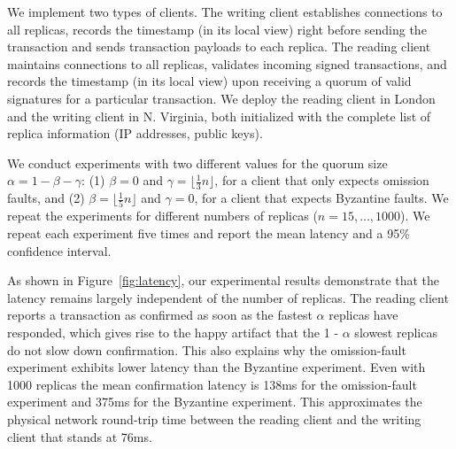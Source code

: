 We implement two types of clients. The writing client establishes connections to all replicas, records
the timestamp (in its local view) right before sending the transaction and sends transaction
payloads to each replica. The reading client maintains connections to all replicas, validates incoming signed
transactions, and records the timestamp (in its local view) upon receiving a quorum of valid signatures for a particular transaction.
We deploy the reading
client in London and the writing client in N. Virginia, both initialized with the complete
list of replica information (IP addresses, public keys).

We conduct experiments with two different values for the quorum size $\alpha = 1 - \beta - \gamma$: (1) $\beta =0 $ and $\gamma = \lfloor \frac{1}{3} n \rfloor$, for a client that only expects omission faults,
and (2) $\beta = \lfloor\frac{1}{5}n\rfloor$ and $\gamma = 0$, for a client that expects Byzantine faults.
We repeat the experiments for
different numbers of replicas ($n = 15, \ldots, 1000$).
We repeat each experiment five times and report the mean latency and a 95\% confidence interval.


As shown in Figure~\ref{fig:latency}, our experimental results demonstrate that the latency remains largely independent
of the number of replicas.
The reading client reports a transaction as confirmed as soon as the fastest
$\alpha$ replicas have responded, which gives rise to the happy artifact that the 1 - $\alpha$ slowest replicas
do not slow down confirmation.
This also explains why the omission-fault experiment exhibits lower latency than the Byzantine experiment.
Even with 1000 replicas the mean confirmation latency is 138ms for the omission-fault experiment and 375ms for the Byzantine experiment.
This approximates
the physical network round-trip time between the reading client and the writing client that stands at 76ms.
